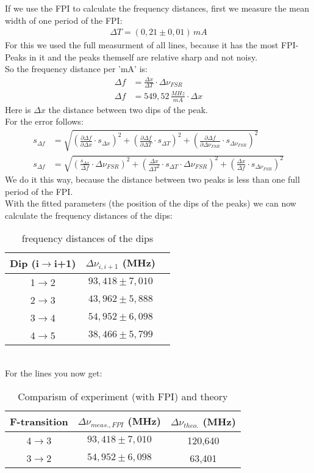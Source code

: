 If we use the FPI to calculate the frequency distances, first we measure the mean width of one period of the FPI:
\begin{align}
    \Delta T=\left(0,21\pm0,01\right)\,mA
\end{align}
For this we used the full measurment of all lines, because it has the most FPI-Peaks in it and the peaks themself are relative sharp and not noisy.\\
So the frequency distance per 'mA' is:
\begin{align}
    \Delta f&=\frac{\Delta x}{\Delta T}\cdot \Delta\nu_{FSR}\\
    \Delta f&=549,52\,\frac{MHz}{mA}\cdot \Delta x
\end{align}
Here is $\Delta x$ the distance between two dips of the peak.\\
For the error follows:
\begin{align}
    s_{\Delta f}&=\sqrt{\left(\frac{\partial \Delta f}{\partial \Delta x}\cdot s_{\Delta x}\right)^2+\left(\frac{\partial \Delta f}{\partial \Delta T}\cdot s_{\Delta T}\right)^2+\left(\frac{\partial \Delta f}{\partial \Delta\nu_{FSR}}\cdot s_{\Delta\nu_{FSR}}\right)^2}\\
    s_{\Delta f}&=\sqrt{\left(\frac{s_{\Delta x}}{\Delta f}\cdot \Delta\nu_{FSR}\right)^2+\left(\frac{\Delta x}{\Delta T^2}\cdot s_{\Delta T}\cdot \Delta\nu_{FSR}\right)^2+\left(\frac{\Delta x}{\Delta f}\cdot s_{\Delta\nu_{FSR}}\right)^2}
\end{align}
We do it this way, because the distance between two peaks is less than one full period of the FPI.\\
With the fitted parameters (the position of the dips of the peaks) we can now calculate the frequency distances of the dips:
\begin{table}[h]
    \centering\begin{tabular}{c|cc}
        Dip (i$\to$i+1)&$\Delta \nu_{i,i+1}$ (MHz)\\\hline
        1$\to$2&$93,418\pm7,010$\\%
        2$\to$3&$43,962\pm5,888$\\%
        3$\to$4&$54,952\pm6,098$\\%
        4$\to$5&$38,466\pm5,799$%
    \end{tabular}
    \caption{frequency distances of the dips}
\end{table}\\
For the lines you now get:
\begin{table}[h]
    \centering\begin{tabular}{c|cc}
        F-transition&$\Delta \nu_{meas., FPI}$ (MHz) & $\Delta \nu_{theo.}$ (MHz) \\\hline
        4$\to$3 &$93,418\pm7,010$&120,640\\
        3$\to$2 &$54,952\pm6,098$ & 63,401
    \end{tabular}
    \caption{Comparism of experiment (with FPI) and theory}
\end{table}\\

